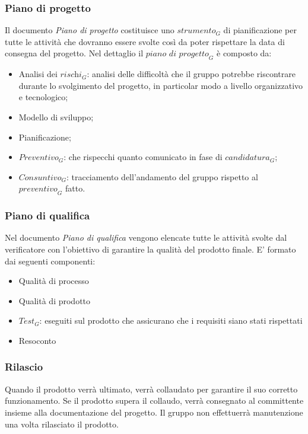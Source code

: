 \subsubsection{Piano di progetto}
Il documento \textit{Piano di progetto} costituisce uno $\textit{strumento}_G$ di pianificazione per tutte le attività che dovranno essere svolte così da poter rispettare la data di consegna del progetto.
Nel dettaglio il $\textit{piano di progetto}_G$ è composto da:
\begin{itemize}
    \item Analisi dei $\textit{rischi}_G$: analisi delle difficoltà che il gruppo potrebbe riscontrare durante lo svolgimento del progetto, in particolar modo a livello organizzativo e tecnologico;
    \item Modello di sviluppo;
    \item Pianificazione;
    \item $\textit{Preventivo}_G$: che rispecchi quanto comunicato in fase di $\textit{candidatura}_G$;
    \item $\textit{Consuntivo}_G$: tracciamento dell'andamento del gruppo rispetto al $\textit{preventivo}_G$ fatto.
\end{itemize}
\subsubsection{Piano di qualifica}
Nel documento \textit{Piano di qualifica} vengono elencate tutte le attività svolte dal verificatore con l'obiettivo di garantire la qualità del prodotto finale.
E' formato dai seguenti componenti:
\begin{itemize}
    \item Qualità di processo
    \item Qualità di prodotto
    \item $\textit{Test}_G$: eseguiti sul prodotto che assicurano che i requisiti siano stati rispettati
    \item Resoconto
\end{itemize}
\subsubsection{Rilascio}
Quando il prodotto verrà ultimato, verrà collaudato per garantire il suo corretto funzionamento. Se il prodotto supera il collaudo, verrà consegnato al committente insieme alla documentazione del progetto. 
Il gruppo non effettuerrà manutenzione una volta rilasciato il prodotto.

